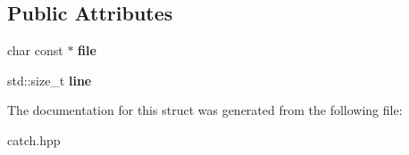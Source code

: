 \subsection*{Public Attributes}
\begin{DoxyCompactItemize}
\item 
\mbox{\label{structCatch_1_1SourceLineInfo_ad65537703e9f08c1fa7777fbc3f0c617}} 
char const  $\ast$ {\bfseries file}
\item 
\mbox{\label{structCatch_1_1SourceLineInfo_a841e5d696c7b9cde24e45e61dd979c77}} 
std\+::size\+\_\+t {\bfseries line}
\end{DoxyCompactItemize}


The documentation for this struct was generated from the following file\+:\begin{DoxyCompactItemize}
\item 
catch.\+hpp\end{DoxyCompactItemize}
